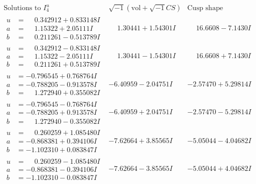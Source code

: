 \documentclass[1p]{elsarticle_modified}
\theoremstyle{definition}
\newcommand{\I}{\sqrt{-1}}
\begin{document}
$$\begin{array}{c|c|c}  
\text{Solutions to }I^u_{4}& \I (\text{vol} + \sqrt{-1}CS) & \text{Cusp shape}\\
 \hline 
\begin{aligned}
u &= \phantom{-}0.342912 + 0.833148 I \\
a &= \phantom{-}1.15322 + 2.05111 I \\
b &= \phantom{-}0.211261 - 0.513789 I\end{aligned}
 & \phantom{-}1.30441 + 1.54301 I & \phantom{-}16.6608 - 7.1430 I \\ \hline\begin{aligned}
u &= \phantom{-}0.342912 - 0.833148 I \\
a &= \phantom{-}1.15322 - 2.05111 I \\
b &= \phantom{-}0.211261 + 0.513789 I\end{aligned}
 & \phantom{-}1.30441 - 1.54301 I & \phantom{-}16.6608 + 7.1430 I \\ \hline\begin{aligned}
u &= -0.796545 + 0.768764 I \\
a &= -0.788205 - 0.913578 I \\
b &= \phantom{-}1.272940 + 0.355082 I\end{aligned}
 & -6.40959 - 2.04751 I & -2.57470 + 5.29814 I \\ \hline\begin{aligned}
u &= -0.796545 - 0.768764 I \\
a &= -0.788205 + 0.913578 I \\
b &= \phantom{-}1.272940 - 0.355082 I\end{aligned}
 & -6.40959 + 2.04751 I & -2.57470 - 5.29814 I \\ \hline\begin{aligned}
u &= \phantom{-}0.260259 + 1.085480 I \\
a &= -0.868381 + 0.394106 I \\
b &= -1.102310 + 0.083847 I\end{aligned}
 & -7.62664 + 3.85565 I & -5.05044 - 4.04682 I \\ \hline\begin{aligned}
u &= \phantom{-}0.260259 - 1.085480 I \\
a &= -0.868381 - 0.394106 I \\
b &= -1.102310 - 0.083847 I\end{aligned}
 & -7.62664 - 3.85565 I & -5.05044 + 4.04682 I \\ \hline\begin{aligned}

\end{aligned}
\end{array}$$
\end{document}
